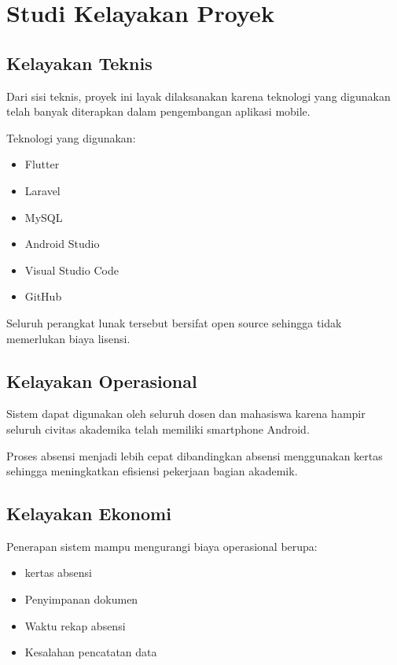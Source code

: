 \documentclass[12pt,a4paper]{article}
\begin{document}
\section{Studi Kelayakan Proyek}

\subsection{Kelayakan Teknis}

Dari sisi teknis, proyek ini layak dilaksanakan karena teknologi yang digunakan telah banyak diterapkan dalam pengembangan aplikasi mobile.

Teknologi yang digunakan:
\begin{itemize}
    \item Flutter
    \item Laravel
    \item MySQL
    \item Android Studio
    \item Visual Studio Code
    \item GitHub
\end{itemize}
Seluruh perangkat lunak tersebut bersifat open source sehingga tidak memerlukan biaya lisensi.

\subsection{Kelayakan Operasional}

Sistem dapat digunakan oleh seluruh dosen dan mahasiswa karena hampir seluruh civitas akademika telah memiliki smartphone Android.

Proses absensi menjadi lebih cepat dibandingkan absensi menggunakan kertas sehingga meningkatkan efisiensi pekerjaan bagian akademik.

\subsection{Kelayakan Ekonomi}

Penerapan sistem mampu mengurangi biaya operasional berupa:

\begin{itemize}
    \item kertas absensi
    \item Penyimpanan dokumen
    \item Waktu rekap absensi
    \item Kesalahan pencatatan data
\end{itemize}
\end{document}
